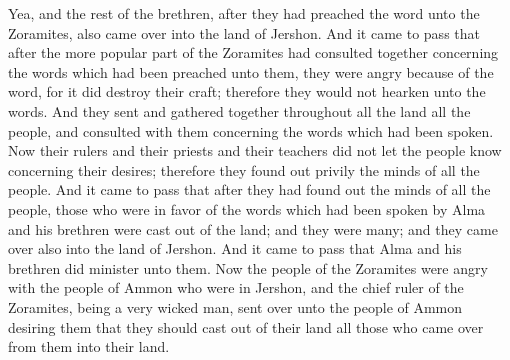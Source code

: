 Yea, and the rest of the brethren, after they had preached the word unto the Zoramites, also came over into the land of Jershon.
\bverse \iffalse And it came to pass that after the more popular part of the Zoramites had consulted together concerning the words which had been preached unto them, they were angry because of the word, for it did destroy their craft; therefore they would not hearken unto the words. \fi
And it came to pass that after the more popular part of the Zoramites had consulted together concerning the words which had been preached unto them, they were angry because of the word, for it did destroy their craft; therefore they would not hearken unto the words.
\bverse \iffalse And they sent and gathered together throughout all the land all the people, and consulted with them concerning the words which had been spoken. \fi
And they sent and gathered together throughout all the land all the people, and consulted with them concerning the words which had been spoken.
\bverse \iffalse Now their rulers and their priests and their teachers did not let the people know concerning their desires; therefore they found out privily the minds of all the people. \fi
Now their rulers and their priests and their teachers did not let the people know concerning their desires; therefore they found out privily the minds of all the people.
\bverse \iffalse And it came to pass that after they had found out the minds of all the people, those who were in favor of the words which had been spoken by Alma and his brethren were cast out of the land; and they were many; and they came over also into the land of Jershon. \fi
And it came to pass that after they had found out the minds of all the people, those who were in favor of the words which had been spoken by Alma and his brethren were cast out of the land; and they were many; and they came over also into the land of Jershon.
\bverse \iffalse And it came to pass that Alma and his brethren did minister unto them. \fi
And it came to pass that Alma and his brethren did minister unto them.
\bverse \iffalse Now the people of the Zoramites were angry with the people of Ammon who were in Jershon, and the chief ruler of the Zoramites, being a very wicked man, sent over unto the people of Ammon desiring them that they should cast out of their land all those who came over from them into their land. \fi
Now the people of the Zoramites were angry with the people of Ammon who were in Jershon, and the chief ruler of the Zoramites, being a very wicked man, sent over unto the people of Ammon desiring them that they should cast out of their land all those who came over from them into their land.
